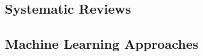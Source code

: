 \documentclass[runningheads,a4paper]{llncs}
\begin{document}
\subsection{Systematic Reviews}



\subsection{Machine Learning Approaches}
\end{document}
